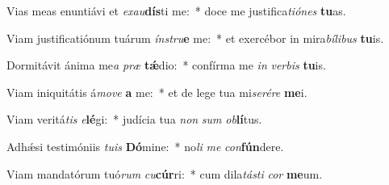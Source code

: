 \item Vias meas enuntiávi et \textit{ex}\textit{au}\textbf{dís}ti me:~* doce me justifica\textit{ti}\textit{ó}\textit{nes} \textbf{tu}as.
\item Viam justificatiónum tuárum \textit{ín}\textit{stru}\textbf{e} me:~* et exercébor in mira\textit{bí}\textit{li}\textit{bus} \textbf{tu}is.
\item Dormitávit ánima me\textit{a} \textit{præ} \textbf{tǽ}dio:~* confírma me \textit{in} \textit{ver}\textit{bis} \textbf{tu}is.
\item Viam iniquitátis á\textit{mo}\textit{ve} \textbf{a} me:~* et de lege tua mi\textit{se}\textit{ré}\textit{re} \textbf{me}i.
\item Viam veritá\textit{tis} \textit{e}\textbf{lé}gi:~* judícia tua \textit{non} \textit{sum} \textit{ob}\textbf{lí}tus.
\item Adhǽsi testimóniis \textit{tu}\textit{is} \textbf{Dó}mine:~* no\textit{li} \textit{me} \textit{con}\textbf{fún}dere.
\item Viam mandatórum tuó\textit{rum} \textit{cu}\textbf{cúr}ri:~* cum dila\textit{tás}\textit{ti} \textit{cor} \textbf{me}um.
